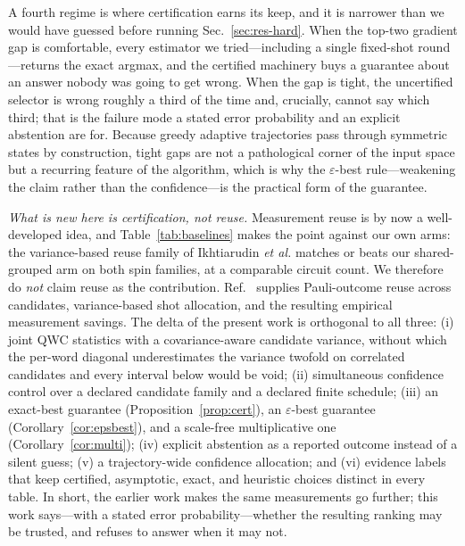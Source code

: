\documentclass[aps,pra,reprint,superscriptaddress,nofootinbib,floatfix]{revtex4-2}
\begin{document}
A fourth regime is where certification earns its keep, and it is narrower than we would have guessed before running Sec.~\ref{sec:res-hard}. When the top-two gradient gap is comfortable, every estimator we tried---including a single fixed-shot round---returns the exact argmax, and the certified machinery buys a guarantee about an answer nobody was going to get wrong. When the gap is tight, the uncertified selector is wrong roughly a third of the time and, crucially, cannot say which third; that is the failure mode a stated error probability and an explicit abstention are for. Because greedy adaptive trajectories pass through symmetric states by construction, tight gaps are not a pathological corner of the input space but a recurring feature of the algorithm, which is why the $\varepsilon$-best rule---weakening the claim rather than the confidence---is the practical form of the guarantee.

\emph{What is new here is certification, not reuse.} Measurement reuse is by now a well-developed idea, and Table~\ref{tab:baselines} makes the point against our own arms: the variance-based reuse family of Ikhtiarudin \emph{et al.} \cite{ikhtiarudin2025shot} matches or beats our shared-grouped arm on both spin families, at a comparable circuit count. We therefore do \emph{not} claim reuse as the contribution. Ref.~\cite{ikhtiarudin2025shot} supplies Pauli-outcome reuse across candidates, variance-based shot allocation, and the resulting empirical measurement savings. The delta of the present work is orthogonal to all three: (i) joint QWC statistics with a covariance-aware candidate variance, without which the per-word diagonal underestimates the variance twofold on correlated candidates and every interval below would be void; (ii) simultaneous confidence control over a declared candidate family and a declared finite schedule; (iii) an exact-best guarantee (Proposition~\ref{prop:cert}), an $\varepsilon$-best guarantee (Corollary~\ref{cor:epsbest}), and a scale-free multiplicative one (Corollary~\ref{cor:multi}); (iv) explicit abstention as a reported outcome instead of a silent guess; (v) a trajectory-wide confidence allocation; and (vi) evidence labels that keep certified, asymptotic, exact, and heuristic choices distinct in every table. In short, the earlier work makes the same measurements go further; this work says---with a stated error probability---whether the resulting ranking may be trusted, and refuses to answer when it may not.
\end{document}
